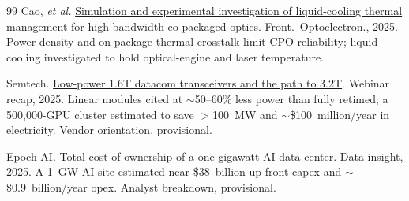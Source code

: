 \begin{thebibliography}{99}
Cao, \emph{et al.}
\newblock \href{https://doi.org/10.1007/s12200-025-00156-4}{Simulation and experimental investigation of liquid-cooling thermal management for high-bandwidth co-packaged optics}.
\newblock Front.\ Optoelectron., 2025.
\newblock Power density and on-package thermal crosstalk limit CPO reliability; liquid cooling investigated to hold optical-engine and laser temperature.

Semtech.
\newblock \href{https://blog.semtech.com/webinar-recap-low-power-1.6t-datacom-transceivers-and-the-path-to-3.2t}{Low-power 1.6T datacom transceivers and the path to 3.2T}.
\newblock Webinar recap, 2025.
\newblock Linear modules cited at $\sim$50--60\% less power than fully retimed; a
500{,}000-GPU cluster estimated to save $>$100~MW and $\sim$\$100~million/year in
electricity. Vendor orientation, provisional.

Epoch AI.
\newblock \href{https://epoch.ai/data-insights/ai-datacenter-cost-breakdown}{Total cost of ownership of a one-gigawatt AI data center}.
\newblock Data insight, 2025.
\newblock A 1~GW AI site estimated near \$38~billion up-front capex and $\sim$\$0.9~billion/year opex. Analyst breakdown, provisional.

\end{thebibliography}
